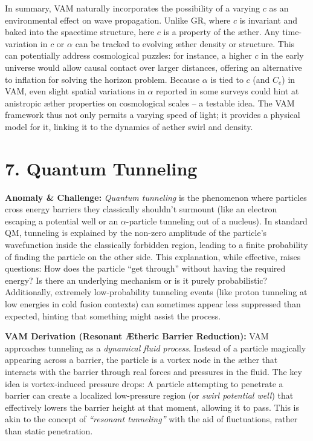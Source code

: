 \documentclass[a4paper, aps,preprint,superscriptaddress, 12pt]{revtex4}
\begin{document}
In summary, VAM naturally incorporates the possibility of a varying $c$ as an environmental effect on wave propagation. Unlike GR, where $c$ is invariant and baked into the spacetime structure, here $c$ is a property of the æther. Any time-variation in $c$ or $\alpha$ can be tracked to evolving æther density or structure. This can potentially address cosmological puzzles: for instance, a higher $c$ in the early universe would allow causal contact over larger distances, offering an alternative to inflation for solving the horizon problem. Because $\alpha$ is tied to $c$ (and $C_e$) in VAM, even slight spatial variations in $\alpha$ reported in some surveys could hint at anistropic æther properties on cosmological scales – a testable idea. The VAM framework thus not only permits a varying speed of light; it provides a physical model for it, linking it to the dynamics of aether swirl and density.


\section*{7. Quantum Tunneling}

\textbf{Anomaly \& Challenge: } \textit{Quantum tunneling} is the phenomenon where particles cross energy barriers they classically shouldn’t surmount (like an electron escaping a potential well or an $\alpha$-particle tunneling out of a nucleus). In standard QM, tunneling is explained by the non-zero amplitude of the particle’s wavefunction inside the classically forbidden region, leading to a finite probability of finding the particle on the other side. This explanation, while effective, raises questions: How does the particle “get through” without having the required energy? Is there an underlying mechanism or is it purely probabilistic? Additionally, extremely low-probability tunneling events (like proton tunneling at low energies in cold fusion contexts) can sometimes appear less suppressed than expected, hinting that something might assist the process.


\textbf{VAM Derivation (Resonant Ætheric Barrier Reduction):} VAM approaches tunneling as a \textit{dynamical fluid process}. Instead of a particle magically appearing across a barrier, the particle is a vortex node in the æther that interacts with the barrier through real forces and pressures in the fluid. The key idea is vortex-induced pressure drops: A particle attempting to penetrate a barrier can create a localized low-pressure region (or \textit{swirl potential well}) that effectively lowers the barrier height at that moment, allowing it to pass. This is akin to the concept of \textit{“resonant tunneling”} with the aid of fluctuations, rather than static penetration.
\end{document}
